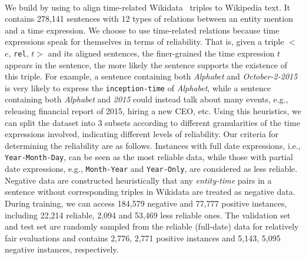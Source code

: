\paragraph{\TimeRE}
We build \TimeRE by
using \DS to align time-related Wikidata~\cite{vrandevcic2014wikidata} \KB triples to
Wikipedia text. It contains 278,141 sentences with 12
types of relations  between an entity mention and a time expression.
We choose to use time-related relations because time expressions speak for themselves in
terms of reliability. That is, given a \KB triple $<$$e$, \texttt{rel}, $t$$>$ and its
aligned sentences,  the  finer-grained the time expression $t$ appears in the sentence,
the more likely the sentence  supports the existence of this triple.
For example, a sentence containing both \emph{Alphabet} and \emph{October-2-2015} is very likely to express the \texttt{inception-time} of \emph{Alphabet}, while a sentence containing both \emph{Alphabet} and \emph{2015} could instead talk  about many events, e.g.,  releasing financial report of 2015, hiring a new CEO, etc.
Using this heuristics, we can split the dataset into
3 subsets according to different granularities of the time expressions involved, indicating different levels of reliability.
Our criteria for determining the reliability are as follows.
Instances with full date expressions, i.e., \texttt{Year-Month-Day}, can be seen as the most reliable data, while those with
partial date expressions, e.g., \texttt{Month-Year} and \texttt{Year-Only}, are considered as less
reliable.  Negative data are constructed  heuristically that any
\emph{entity-time} pairs in a sentence without corresponding triples in Wikidata are treated as negative data.
During training, we can access  184,579 negative
 and  77,777 positive instances, including 22,214 reliable, 
2,094 and 53,469 less reliable ones. The validation set and test set are randomly sampled from
the reliable (full-date) data for relatively fair evaluations and contains
2,776, 2,771 positive instances and 5,143, 5,095 negative instances, respectively.


